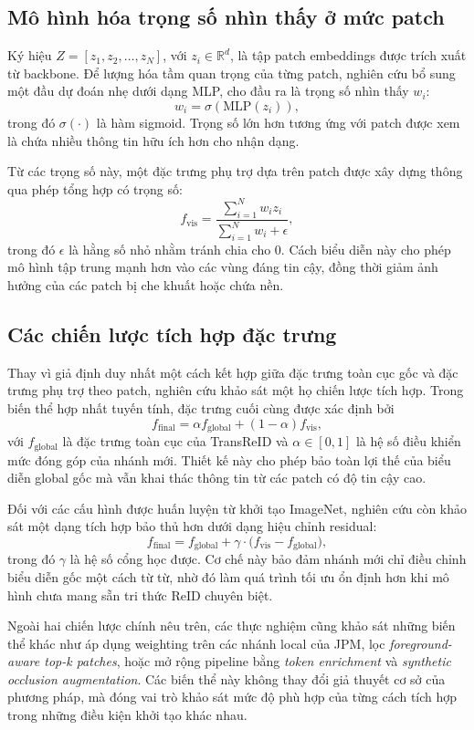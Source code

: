 \subsection{Mô hình hóa trọng số nhìn thấy ở mức patch}

Ký hiệu \(Z=[z_1,z_2,\dots,z_N]\), với \(z_i \in \mathbb{R}^{d}\), là tập patch
embeddings được trích xuất từ backbone. Để lượng hóa tầm quan trọng của từng
patch, nghiên cứu bổ sung một đầu dự đoán nhẹ dưới dạng MLP, cho đầu ra là
trọng số nhìn thấy \(w_i\):
\[
w_i = \sigma(\mathrm{MLP}(z_i)),
\]
trong đó \(\sigma(\cdot)\) là hàm sigmoid. Trọng số lớn hơn tương ứng với patch
được xem là chứa nhiều thông tin hữu ích hơn cho nhận dạng.

Từ các trọng số này, một đặc trưng phụ trợ dựa trên patch được xây dựng thông
qua phép tổng hợp có trọng số:
\[
f_{\mathrm{vis}} = \frac{\sum_{i=1}^{N} w_i z_i}{\sum_{i=1}^{N} w_i + \epsilon},
\]
trong đó \(\epsilon\) là hằng số nhỏ nhằm tránh chia cho \(0\). Cách biểu diễn
này cho phép mô hình tập trung mạnh hơn vào các vùng đáng tin cậy, đồng thời
giảm ảnh hưởng của các patch bị che khuất hoặc chứa nền.

\subsection{Các chiến lược tích hợp đặc trưng}

Thay vì giả định duy nhất một cách kết hợp giữa đặc trưng toàn cục gốc và đặc
trưng phụ trợ theo patch, nghiên cứu khảo sát một họ chiến lược tích hợp. Trong
biến thể hợp nhất tuyến tính, đặc trưng cuối cùng được xác định bởi
\[
f_{\mathrm{final}} = \alpha f_{\mathrm{global}} + (1-\alpha) f_{\mathrm{vis}},
\]
với \(f_{\mathrm{global}}\) là đặc trưng toàn cục của TransReID và
\(\alpha \in [0,1]\) là hệ số điều khiển mức đóng góp của nhánh mới. Thiết kế
này cho phép bảo toàn lợi thế của biểu diễn global gốc mà vẫn khai thác
thông tin từ các patch có độ tin cậy cao.

Đối với các cấu hình được huấn luyện từ khởi tạo ImageNet, nghiên cứu còn khảo
sát một dạng tích hợp bảo thủ hơn dưới dạng hiệu chỉnh residual:
\[
f_{\mathrm{final}} = f_{\mathrm{global}} + \gamma \cdot
\bigl(f_{\mathrm{vis}} - f_{\mathrm{global}}\bigr),
\]
trong đó \(\gamma\) là hệ số cổng học được. Cơ chế này bảo đảm nhánh mới chỉ
điều chỉnh biểu diễn gốc một cách từ từ, nhờ đó làm quá trình tối ưu ổn định
hơn khi mô hình chưa mang sẵn tri thức ReID chuyên biệt.

Ngoài hai chiến lược chính nêu trên, các thực nghiệm cũng khảo sát những biến
thể khác như áp dụng weighting trên các nhánh local của JPM, lọc
\textit{foreground-aware top-k patches}, hoặc mở rộng pipeline bằng \textit{token enrichment} và
\textit{synthetic occlusion augmentation}. Các biến thể này không thay đổi giả thuyết cơ
sở của phương pháp, mà đóng vai trò khảo sát mức độ phù hợp của từng cách tích
hợp trong những điều kiện khởi tạo khác nhau.


